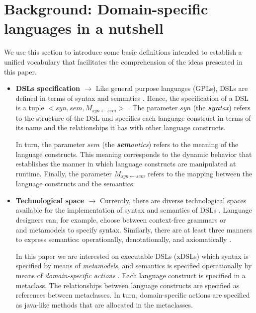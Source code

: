 \section{Background: Domain-specific languages in a nutshell}
\label{sec:background}
 
We use this section to introduce some basic definitions intended to establish a unified vocabulary that facilitates the comprehension of the ideas presented in this paper. 
 
\begin{itemize}


\item{\textbf{DSLs specification $\rightarrow$}} Like general purpose languages (GPLs), DSLs are defined in terms of syntax and semantics \cite{Harel:2004b}. Hence, the specification of a DSL is a tuple $<syn,sem,M_{syn\leftarrow sem}>$ \cite{Combemale:2013}. The parameter $syn$ (the \textit{\textbf{syn}tax}) refers to the structure of the DSL and specifies each language construct in terms of its name and the relationships it has with other language constructs.

\hspace{3mm} In turn, the parameter $sem$ (the \textit{\textbf{sem}antics}) refers to the meaning of the language constructs. This meaning corresponds to the dynamic behavior that establishes the manner in which language constructs are manipulated at runtime. Finally, the parameter $M_{syn\leftarrow sem}$ refers to the mapping between the language constructs and the semantics. 

\vspace{2mm}

\item{\textbf{Technological space $\rightarrow$}} Currently, there are diverse technological spaces available for the implementation of syntax and semantics of DSLs \cite{Mernik:2005b}. Language designers can, for example, choose between context-free grammars or\\and metamodels to specify syntax. Similarly, there are at least three manners to express semantics: operationally, denotationally, and axiomatically \cite{Mosses:2001}.

\hspace{3mm} In this paper we are interested on executable DSLs (xDSLs) which syntax is specified by means of \textit{metamodels}, and semantics is specified operationally by means of \textit{domain-specific actions} \cite{Combemale:2013}. Each language construct is specified in a metaclass. The relationships between language constructs are specified as references between metaclasses. In turn, domain-specific actions are specified as java-like methods that are allocated in the metaclasses.

\end{itemize}

